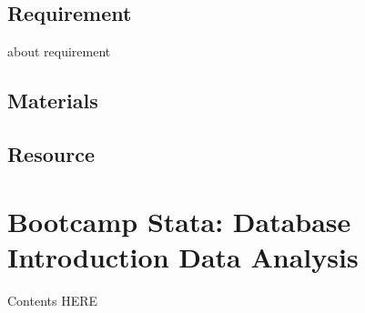 \documentclass[
]{book}
\begin{document}
\hypertarget{requirement}{%
\section{Requirement}\label{requirement}}

about requirement

\hypertarget{materials}{%
\section{Materials}\label{materials}}

\hypertarget{resource}{%
\section{Resource}\label{resource}}

\hypertarget{bootcamp-stata-database-introduction-data-analysis}{%
\chapter{Bootcamp Stata: Database Introduction Data Analysis}\label{bootcamp-stata-database-introduction-data-analysis}}

Contents HERE
\end{document}
